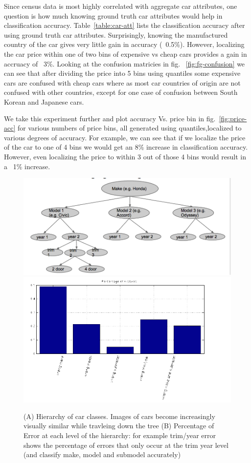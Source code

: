 \documentclass[10pt,twocolumn,letterpaper]{article}
\begin{document}
Since census data is most highly correlated with aggregate car attributes, one question is how much knowing ground truth car attributes would help in classification accuracy. Table~\ref{table:car-att} lists the classification accuracy after using ground truth car attributes. Surprisingly, knowing the manufactured country of the car gives very little gain in accuracy (~0.5\%). However, localizing the car price within one of two bins of expensive vs cheap cars provides a gain in accruacy of ~3\%. Looking at the confusion matricies in fig. ~\ref{fig:fg-confusion} we can see that after dividing the price into 5 bins using quantiles some expensive cars are confused with cheap cars where as most car countries of origin are not confused with other countries, except for one case of confusion between South Korean and Japanese cars. 

We take this experiment further and plot accuracy Vs. price bin in fig.~\ref{fig:price-acc} for various numbers of price bins, all generated using quantiles,localized to various degrees of accuracy. For example, we can see that if we localize the price of the car to one of 4 bins we would get an 8\% increase in classification accuracy. However, even localizing the price to within 3 out of those 4 bins would result in a ~1\% increase.

\begin{figure}[t]
\begin{center}
   \includegraphics[width=0.4\linewidth]{img/fg-hierarchy.png}
   \hspace{0.1\linewidth}
   \includegraphics[width=0.4\linewidth]{img/percent-error.png}
\end{center}
   \caption{(A) Hierarchy of car classes. Images of cars become increasingly visually similar while travleing down the tree (B) Percentage of Error at each level of the hierarchy: for example trim/year error shows the percentage of errors that only occur at the trim year level (and classify make, model and submodel accurately)} 
\label{fig*:fg-hierarchy}
\end{figure}
\end{document}
